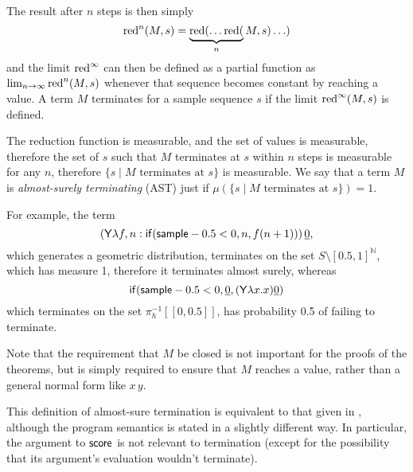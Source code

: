 The result after $n$ steps is then simply 
\[
\operatorname{red}^n(M,s) = \underbrace{\operatorname{red}(\ldots\operatorname{red}(}_n M,s)\ldots)
\] 
and the limit $\operatorname{red}^\infty$ can then be defined as a partial function as $\lim_{n \to \infty} \operatorname{red}^n(M,s)$ whenever that sequence becomes constant by reaching a value. A term $M$ terminates for a sample sequence $s$ if the limit $\operatorname{red}^\infty(M,s)$ is defined.

The reduction function is measurable, and the set of values is measurable, therefore the set of $s$ such that $M$ terminates at $s$ within $n$ steps is measurable for any $n$, therefore $\{s \mid M \text{ terminates at } s \}$ is measurable. 
We say that a term $M$ is \emph{almost-surely terminating} (AST) just if $\mu(\{s \mid M \text{ terminates at } s\}) = 1$.

\iffalse
\lo{Alternatively, define the \emph{runtime of $M$} to be the random variable 
\[
T_M(s) := 
\begin{cases}
\min \set{n \mid \pi_0(\red^n(M, s)) \textrm{ is a value}} & \hbox{if $\red^\infty(M,s)$ is defined}\\
\infty & \hbox{otherwise}
\end{cases}
\]
Equivalently, we say that $M$ is \emph{almost-surely terminating} (AST) if $T_M < \infty$ a.s.; 
and $M$ is \emph{positively almost-surely terminating} (PAST) if $\expect{T_M} < \infty$.}
\fi
For example, the term 
\[
(\mathsf{Y} \lambda f, n: \mathsf{if}(\mathsf{sample} - 0.5 < 0, n, f (n+1)) ) \, \underline{0},
\] 
which generates a geometric distribution, terminates on the set $S \setminus [0.5,1]^\mathbb N$, which has measure 1, therefore it terminates almost surely, whereas 
\[
\mathsf{if}(\mathsf{sample} - 0.5 < 0, \underline 0, (\mathsf{Y} \lambda x. x) \underline 0)
\] 
which terminates on the set $\pi_h^{-1}[[0,0.5]]$, has probability 0.5 of failing to terminate.

Note that the requirement that $M$ be closed is not important for the proofs of the theorems, but is simply required to ensure that $M$ reaches a value, rather than a general normal form like $x \, y$.

This definition of almost-sure termination is equivalent to that given in \citep{MakOPW21}, although the program semantics is stated in a slightly different way. In particular, the argument to $\tscore$ is not relevant to termination (except for the possibility that its argument's evaluation wouldn't terminate).

\iffalse
\lo{Your operational semantics does not maintain a record of the current weight of the reduction.
A.s.~termination does depend on $\tscore$: see \cite[\S 4.3]{MakOPW21}\footnote{\url{https://arxiv.org/abs/2004.03924}}.
I think it important to take the behaviour of $\tscore$ into account;
you should do it as a future task.}
\fi
